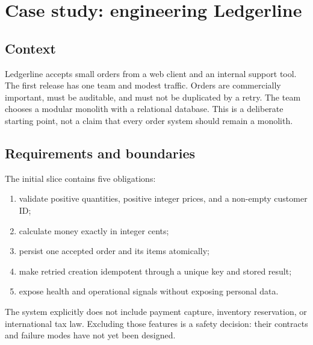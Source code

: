 \chapter{Case study: engineering Ledgerline}

\section{Context}
Ledgerline accepts small orders from a web client and an internal support tool.
The first release has one team and modest traffic. Orders are commercially
important, must be auditable, and must not be duplicated by a retry. The team
chooses a modular monolith with a relational database. This is a deliberate
starting point, not a claim that every order system should remain a monolith.

\section{Requirements and boundaries}
The initial slice contains five obligations:

\begin{enumerate}
  \item validate positive quantities, positive integer prices, and a non-empty customer ID;
  \item calculate money exactly in integer cents;
  \item persist one accepted order and its items atomically;
  \item make retried creation idempotent through a unique key and stored result;
  \item expose health and operational signals without exposing personal data.
\end{enumerate}

The system explicitly does not include payment capture, inventory reservation,
or international tax law. Excluding those features is a safety decision: their
contracts and failure modes have not yet been designed.

